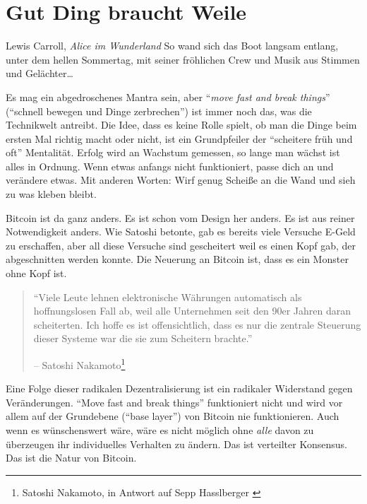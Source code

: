 \chapter{Gut Ding braucht Weile}
\label{les:18}

\begin{chapquote}{Lewis Carroll, \textit{Alice im Wunderland}}
So wand sich das Boot langsam entlang, unter dem hellen Sommertag, mit seiner
fröhlichen Crew und Musik aus Stimmen und Gelächter\ldots
\end{chapquote}

Es mag ein abgedroschenes Mantra sein, aber \enquote{\textit{move fast and break
things}} (\enquote{schnell bewegen und Dinge zerbrechen}) ist immer noch das, was
die Technikwelt antreibt. Die Idee, dass es keine Rolle spielt, ob man die Dinge
beim ersten Mal richtig macht oder nicht, ist ein Grundpfeiler der
\enquote{scheitere früh und oft} Mentalität. Erfolg wird an Wachstum gemessen,
so lange man wächst ist alles in Ordnung. Wenn etwas anfangs nicht funktioniert,
passe dich an und verändere etwas. Mit anderen Worten: Wirf genug Scheiße an die
Wand und sieh zu was kleben bleibt.

Bitcoin ist da ganz anders. Es ist schon vom Design her anders. Es ist aus
reiner Notwendigkeit anders. Wie Satoshi betonte, gab es bereits viele Versuche
E-Geld zu erschaffen, aber all diese Versuche sind gescheitert weil es einen
Kopf gab, der abgeschnitten werden konnte. Die Neuerung an Bitcoin ist, dass es
ein Monster ohne Kopf ist.

\begin{quotation}\begin{samepage}
\enquote{Viele Leute lehnen elektronische Währungen automatisch als
hoffnungslosen Fall ab, weil alle Unternehmen seit den 90er Jahren daran
scheiterten. Ich hoffe es ist offensichtlich, dass es nur die zentrale Steuerung
dieser Systeme war die sie zum Scheitern brachte.} \begin{flushright} -- Satoshi
Nakamoto\footnote{Satoshi Nakamoto, in  Antwort auf Sepp Hasslberger
\cite{satoshi-centralized-nature}}
\end{flushright}\end{samepage}\end{quotation}

Eine Folge dieser radikalen Dezentralisierung ist ein radikaler Widerstand gegen
Veränderungen. \enquote{Move fast and break things} funktioniert nicht und wird
vor allem auf der Grundebene (\enquote{base layer}) von Bitcoin nie
funktionieren. Auch wenn es wünschenswert wäre, wäre es nicht möglich ohne
\textit{alle} davon zu überzeugen ihr individuelles Verhalten zu ändern. Das ist
verteilter Konsensus. Das ist die Natur von Bitcoin.

